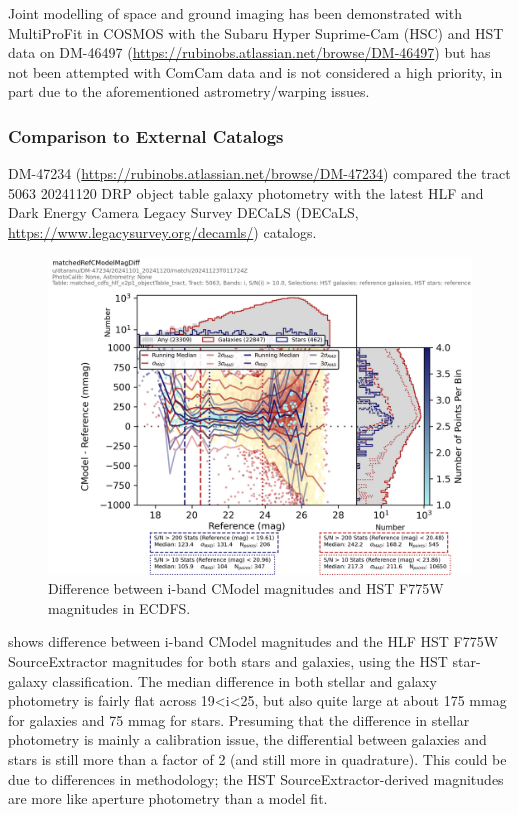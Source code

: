 Joint modelling of space and ground imaging has been demonstrated with MultiProFit in COSMOS with the Subaru Hyper Suprime-Cam (HSC) and HST data on DM-46497 (\url{https://rubinobs.atlassian.net/browse/DM-46497}) but has not been attempted with ComCam data and is not considered a high priority, in part due to the aforementioned astrometry/warping issues.
\fi

\subsubsection{Comparison to External Catalogs}
\label{subsec:galaxy_photometry_external_catalogs}

DM-47234 (\url{https://rubinobs.atlassian.net/browse/DM-47234}) compared the tract 5063 20241120 DRP object table galaxy photometry with the latest HLF and Dark Energy Camera Legacy Survey DECaLS (DECaLS, \url{https://www.legacysurvey.org/decamls/}) catalogs.

\begin{figure}
  \includegraphics{galaxy_photometry/cdfs_i_vs_HST_F775W.png}
  \caption{Difference between i-band CModel magnitudes and HST F775W magnitudes in ECDFS.}
  \label{fig:cdfs_i_vs_HST_F775W}
\end{figure}

 shows difference between i-band CModel magnitudes and the HLF HST F775W SourceExtractor magnitudes for both stars and galaxies, using the HST star-galaxy classification.
The median difference in both stellar and galaxy photometry is fairly flat across 19<i<25, but also quite large at about 175 mmag for galaxies and 75 mmag for stars.
Presuming that the difference in stellar photometry is mainly a calibration issue, the differential between galaxies and stars is still more than a factor of 2 (and still more in quadrature).
This could be due to differences in methodology; the HST SourceExtractor-derived magnitudes are more like aperture photometry than a model fit.

